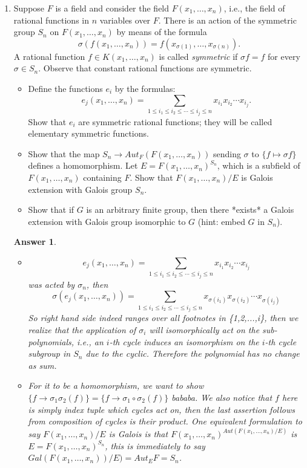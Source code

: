 \documentclass[11pt,leqno]{article}
\newcommand{\<}[1]{{\langle}#1 {\rangle}}
\theoremstyle{plain}
\newtheorem*{answer*}{Answer}
\theoremstyle{definition}
\theoremstyle{remark}
\numberwithin{equation}{section}
\begin{document}
\begin{enumerate}
\item Suppose $F$ is a field and consider the field $F(x_1,\ldots,x_n)$, i.e., the field of rational functions in $n$ variables over $F$.  There is an action of the symmetric group $S_n$ on $F(x_1,\ldots,x_n)$ by means of the formula
    \[
    \sigma(f(x_1,\ldots,x_n)) = f(x_{\sigma(1)},\ldots,x_{\sigma(n)}).
    \]
    A rational function $f \in K(x_1,\ldots,x_n)$ is called {\em symmetric} if $\sigma f = f$ for every $\sigma \in S_n$.  Observe that constant rational functions are symmetric.
    \begin{itemize}
    \item[i)] Define the functions $e_i$ by the formulas:
    \[
    e_j(x_1,\ldots,x_n) = \sum_{1 \leq i_1 \leq i_2 \leq \cdots \leq i_j \leq n} x_{i_1} x_{i_2} \cdots x_{i_j}.
    \]
    Show that $e_i$ are symmetric rational functions; they will be called elementary symmetric functions.
    \item[ii)] Show that the map $S_n \to Aut_F(F(x_1,\ldots,x_n))$ sending $\sigma$ to $\{ f \mapsto \sigma f \}$ defines a homomorphism.  Let $E = F(x_1,\ldots,x_n)^{S_n}$, which is a subfield of $F(x_1,\ldots,x_n)$ containing $F$.  Show that $F(x_1,\ldots,x_n)/E$ is Galois extension with Galois group $S_n$.
    \item[iii)] Show that if $G$ is an arbitrary finite group, then there *exists* a Galois extension with Galois group isomorphic to $G$ (hint: embed $G$ in $S_n$).
    \end{itemize}

    \begin{answer*}
        \begin{itemize}
            \item [i)] 
            $$ e_j(x_1,\ldots,x_n) = \sum_{1 \leq i_1 \leq i_2 \leq \cdots \leq i_j \leq n} x_{i_1} x_{i_2} \cdots x_{i_j} $$ was acted by $\sigma_n$, then $$ \sigma(e_j(x_1,\ldots,x_n)) = \sum_{1 \leq i_1 \leq i_2 \leq \cdots \leq i_j \leq n} x_{\sigma(i_1)} x_{\sigma(i_2)} \cdots x_{\sigma(i_j)} $$ So right hand side indeed ranges over all footnotes in \{1,2,...,i\}, then we realize that the application of $\sigma_i$ will isomorphically act on the sub-polynomials, i.e., an $i$-th cycle induces an isomorphism on the $i$-th cycle subgroup in $S_n$ due to the cyclic. Therefore the polynomial has no change as sum.
            
            \item [ii)] For it to be a homomorphism, we want to show $\{f\rightarrow  \sigma_1\sigma_2(f) \}= \{f\rightarrow \sigma_1 \circ \sigma_2(f) \}  $ bababa. We also notice that $f$ here is simply index tuple which cycles act on, then the last assertion follows from composition of cycles is their product.  One equivalent formulation to say $F(x_1,\ldots,x_n)/E$ is Galois is that $F(x_1,\ldots,x_n)^{Aut(F(x_1,\ldots,x_n)/E)}$ is $E=F(x_1,\ldots,x_n)^{S_n}$, this is immediately to say $Gal(F(x_1,\ldots,x_n))/E)=Aut_E F=S_n$. \\
            

\end{itemize}
\end{answer*}
\end{enumerate}
\end{document}

